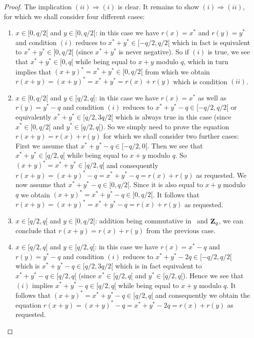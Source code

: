 \documentclass{article}
\newcommand{\zq}{\mbox{${\bf Z}_{q}$}}
\begin{document}
\begin{proof}
  The implication $(ii)\Rightarrow(i)$ is clear. It remains to show 
  $(i)\Rightarrow(ii)$, for which we shall consider four different cases:
  \begin{enumerate}
    \item $x\in[0,q/2[$ and $y\in[0,q/2[$: in this case we have $r(x)=x^{*}$
      and $r(y)=y^{*}$ and condition $(i)$ reduces to $x^{*}+y^{*}\in[-q/2,q/2[$
      which in fact is equivalent to $x^{*}+y^{*}\in[0,q/2[$ (since $x^{*}+y^{*}$
      is never negative). So if $(i)$ is true, we see that $x^{*}+y^{*}\in[0,q[$
      while being equal to $x+y$ modulo $q$, which in turn implies that 
      $(x+y)^{*}=x^{*}+y^{*}\in[0,q/2[$ from which we obtain 
      $r(x+y)=(x+y)^{*}=x^{*}+y^{*}=r(x)+r(y)$ which is condition $(ii)$. 
    \item $x\in[0,q/2[$ and $y\in[q/2,q[$: in this case we have $r(x)=x^{*}$
      as well as $r(y)=y^{*}-q$ and condition $(i)$ reduces to 
      $x^{*}+y^{*}-q\in[-q/2,q/2[$ or equivalently $x^{*}+y^{*}\in[q/2,3q/2[$
      which is always true in this case (since $x^{*}\in[0,q/2[$ and 
      $y^{*}\in[q/2,q[$). So we simply need to prove the equation 
      $r(x+y)=r(x)+r(y)$ for which we shall consider two further cases: 
      First we assume that $x^{*}+y^{*}-q\in[-q/2,0[$. Then we see that 
      $x^{*}+y^{*}\in[q/2,q[$ while being equal to $x+y$ modulo $q$. 
      So $(x+y)^{*}=x^{*}+y^{*}\in[q/2,q[$ and consequently 
      $r(x+y)= (x+y)^{*}-q=x^{*}+y^{*}-q = r(x)+r(y)$ as requested.
      We now assume that $x^{*}+y^{*}-q\in[0,q/2[$. Since it is also equal
      to $x+y$ modulo $q$ we obtain $(x+y)^{*}=x^{*}+y^{*}-q\in[0,q/2[$.
      It follows that $r(x+y)=(x+y)^{*}=x^{*}+y^{*}-q = r(x)+r(y)$ as 
      requested.
    \item $x\in[q/2,q[$ and $y\in[0,q/2[$: addition being commutative
      in \Z\ and \zq, we can conclude that $r(x+y)=r(x)+r(y)$ from
      the previous case.
    \item $x\in[q/2,q[$ and $y\in[q/2,q[$: in this case we have $r(x)=x^{*}-q$
      and $r(y)=y^{*}-q$ and condition $(i)$ reduces to 
      $x^{*}+y^{*}-2q\in[-q/2,q/2[$ which is $x^{*}+y^{*}-q\in[q/2,3q/2[$
      which is in fact equivalent to $x^{*}+y^{*}-q\in[q/2,q[$ (since 
      $x^{*}\in[q/2,q[$ and $y^{*}\in[q/2,q[$). Hence we see that $(i)$ 
      implies $x^{*}+y^{*}-q\in[q/2,q[$ while being equal to $x+y$ modulo
      $q$. It follows that $(x+y)^{*}=x^{*}+y^{*}-q\in[q/2,q[$ and
      consequently we obtain the equation 
      $r(x+y) = (x+y)^{*}-q=x^{*}+y^{*}-2q=r(x)+r(y)$ as requested.
  \end{enumerate}
\end{proof}
\end{document}
